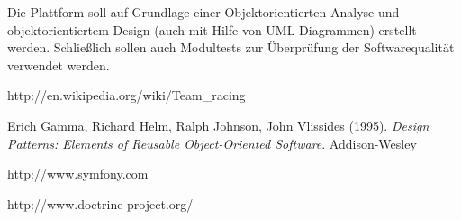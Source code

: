 \documentclass[11pt]{article}
\begin{document}
Die Plattform soll auf Grundlage einer Objektorientierten Analyse und objektorientiertem Design (auch mit Hilfe von UML-Diagrammen) erstellt werden. Schließlich sollen auch Modultests zur Überprüfung der Softwarequalität verwendet werden.

\begin{thebibliography}{9}

http://en.wikipedia.org/wiki/Team\_racing
  
Erich Gamma, Richard Helm, Ralph Johnson, John Vlissides (1995).
\emph{Design Patterns: Elements of Reusable Object-Oriented Software}.
Addison-Wesley
  
http://www.symfony.com

http://www.doctrine-project.org/

\end{thebibliography}
\end{document}
